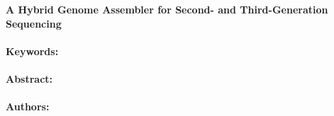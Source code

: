 \noindent
\large {\bf A Hybrid Genome Assembler for Second- and Third-Generation Sequencing} 


\normalsize 


\noindent \paragraph{Keywords:} 

\noindent \paragraph{Abstract:} 



\noindent \paragraph{Authors:} 

